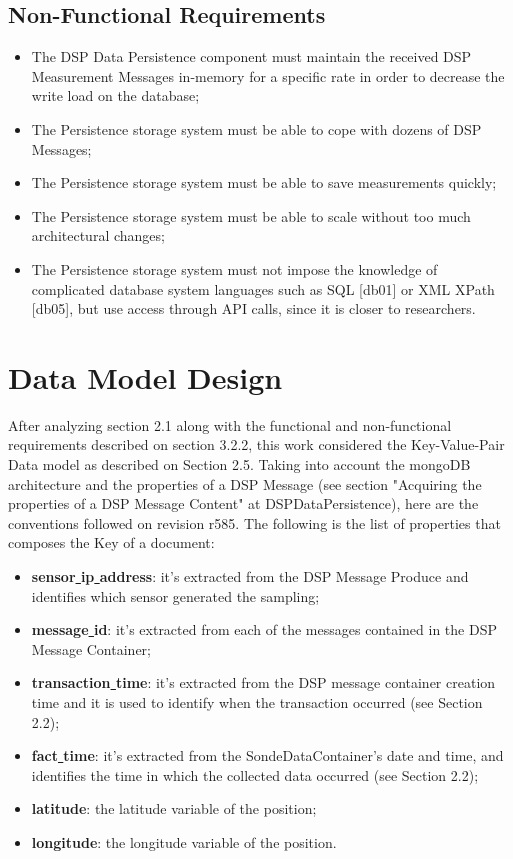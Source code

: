 \subsection{Non-Functional Requirements}

\begin{itemize}
  \item The DSP Data Persistence component must maintain the received DSP
  Measurement Messages in-memory for a specific rate in order to decrease the
  write load on the database;
  \item The Persistence storage system must be able to cope with dozens of DSP
  Messages;
  \item The Persistence storage system must be able to save measurements quickly;
  \item The Persistence storage system must be able to scale without too much
  architectural changes;
  \item The Persistence storage system must not impose the knowledge of
  complicated database system languages such as SQL [db01] or XML XPath [db05],
  but use access through API calls, since it is closer to researchers. 
\end{itemize}
    
\section{Data Model Design}

After analyzing section 2.1 along with the functional and non-functional
requirements described on section 3.2.2, this work considered the
Key-Value-Pair Data model as described on Section 2.5. Taking into account the
mongoDB architecture and the properties of a DSP Message (see section
"Acquiring the properties of a DSP Message Content" at DSPDataPersistence),
here are the conventions followed on revision r585. The following is the list
of properties that composes the Key of a document:

\begin{itemize}
  \item \textbf{sensor\underline{ }ip\underline{ }address}: it's extracted from
  the DSP Message Produce and identifies which sensor generated the sampling;
  \item \textbf{message\underline{ }id}: it's extracted from each of the messages contained
  in the DSP Message Container;
  \item \textbf{transaction\underline{ }time}: it's extracted from the DSP message container
  creation time and it is used to identify when the transaction occurred (see Section 2.2);
  \item \textbf{fact\underline{ }time}: it's extracted from the SondeDataContainer's date
  and time, and identifies the time in which the collected data occurred (see Section 2.2);
  \item \textbf{latitude}: the latitude variable of the position;
  \item \textbf{longitude}: the longitude variable of the position.
\end{itemize}

